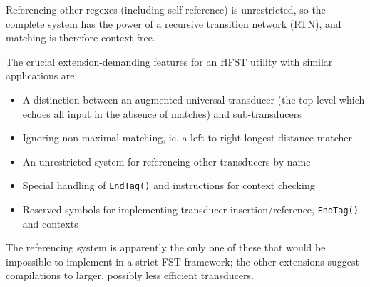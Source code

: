 \documentclass[draft]{llncs}
\begin{document}
Referencing other regexes (including self-reference) is unrestricted, so
the complete system has the power of a recursive transition network (RTN),
and matching is therefore context-free.

The crucial extension-demanding features for an HFST utility
with similar applications are:

\begin{itemize}
\item A distinction between an augmented universal transducer (the top level
  which echoes all input in the absence of matches) and sub-transducers
\item Ignoring non-maximal matching, ie. a left-to-right longest-distance
  matcher
\item An unrestricted system for referencing other transducers by name
\item Special handling of \verb!EndTag()! and instructions for context
  checking
\item Reserved symbols for implementing transducer insertion/reference,
  \verb!EndTag()! and contexts
\end{itemize}

The referencing system is apparently the only one of these that would be
impossible to implement in a strict FST framework; the other extensions suggest
compilations to larger, possibly less efficient transducers.




\end{document}
